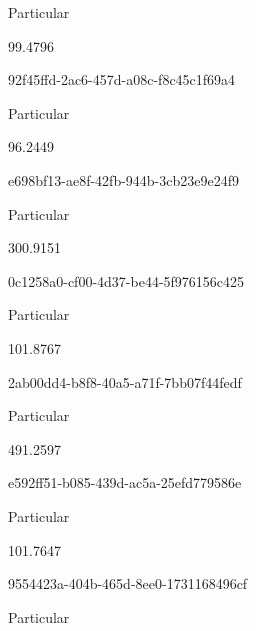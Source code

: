 \documentclass[
  11pt,
  a4paper,
  DIV=11,
  numbers=noendperiod]{scrartcl}
\begin{document}
Particular

\n      

99.4796

\n    

\n    

\n      

92f45ffd-2ac6-457d-a08c-f8c45c1f69a4

\n      

Particular

\n      

96.2449

\n    

\n    

\n      

e698bf13-ae8f-42fb-944b-3cb23e9e24f9

\n      

Particular

\n      

300.9151

\n    

\n    

\n      

0c1258a0-cf00-4d37-be44-5f976156c425

\n      

Particular

\n      

101.8767

\n    

\n    

\n      

2ab00dd4-b8f8-40a5-a71f-7bb07f44fedf

\n      

Particular

\n      

491.2597

\n    

\n    

\n      

e592ff51-b085-439d-ac5a-25efd779586e

\n      

Particular

\n      

101.7647

\n    

\n    

\n      

9554423a-404b-465d-8ee0-1731168496cf

\n      

Particular
\end{document}
